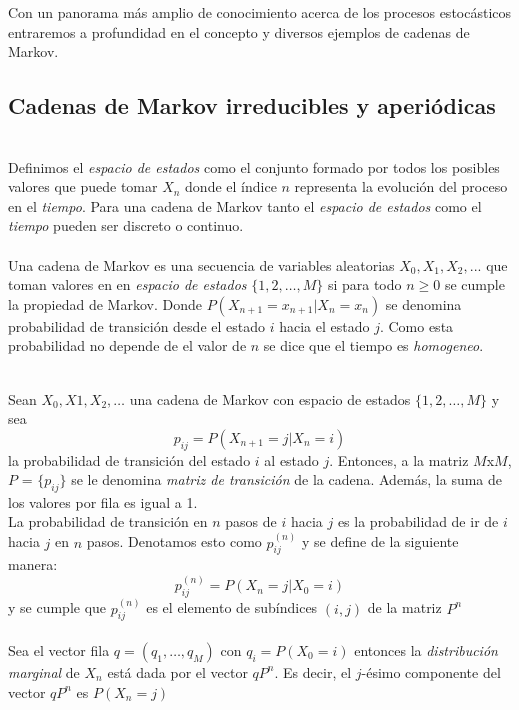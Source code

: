 \documentclass[10pt,a4paper]{article}
\theoremstyle{definition}
\theoremstyle{remark}
\begin{document}
\begin{multicols}{2}
\noindent Con un panorama más amplio de conocimiento acerca de los procesos estocásticos entraremos a profundidad en el concepto y diversos ejemplos de cadenas de Markov.\\
\subsection{Cadenas de Markov irreducibles y aperiódicas}
\\
Definimos el \textit{espacio de estados} como el conjunto formado por todos los posibles 
valores que puede tomar $X_{n}$ donde el índice $n$ representa la evolución del proceso 
en el \textit{tiempo}. Para una cadena de Markov tanto el \textit{espacio de estados} 
como el \textit{tiempo} pueden ser discreto o continuo.\\

\\
Una cadena de Markov es una secuencia de variables aleatorias $X_{0},X_{1},X_{2},...$ 
que toman valores en en \textit{espacio de estados} $\{1,2,\dots,M\}$ si para todo $n
\geq0$ se cumple la propiedad de Markov. Donde $P(X_{n+1}=x_{n+1}|X_{n}=x_n)$ se 
denomina probabilidad de transición desde el estado $i$ hacia el estado $j$. Como esta 
probabilidad no depende de el valor de $n$ se dice que el tiempo es \textit{homogeneo}.\
\

\\
Sean $X_{0},X{1},X_{2},\dots$ una cadena de Markov con espacio de estados $\{1,2,\dots,M\}$ y sea
\[
p_{ij} = P(X_{n+1}=j|X_{n}=i)
\] 
la probabilidad de transición del estado $i$ al estado $j$. Entonces, a la matriz $M$x$M$, $P$ = $\{p_{ij}\}$ se le denomina \textit{matriz de transición} de la cadena. Además, la suma de los valores por fila es igual a 1.\\

La probabilidad de transición en $n$ pasos de $i$ hacia $j$ es la probabilidad de ir de $i$ hacia $j$ en $n$ pasos. Denotamos esto como $p_{ij}^{(n)}$ y se define de la siguiente manera:
\[
p_{ij}^{(n)} = P(X_{n}=j|X_{0}=i)
\]
y se cumple que $p_{ij}^{(n)}$ es el elemento de subíndices $(i,j)$ de la matriz $P^{n}$\\

\\
Sea el vector fila $q = (q_{1},\dots,q_{M})$ con $q_{i} = P(X_{0} = i)$ entonces la \textit{distribución marginal} de $X_{n}$ está dada por el vector $qP^{n}$. Es decir, el $j$-ésimo componente del vector $qP^{n}$ es $P(X_{n} = j)$\\


\end{multicols}
\end{document}
